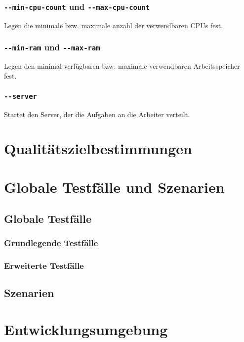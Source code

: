 \documentclass[a4paper,12pt]{article}
\begin{document}
\subsubsection{\texttt{-{}-min-cpu-count} und \texttt{-{}-max-cpu-count}}
Legen die minimale bzw. maximale anzahl der verwendbaren \glspl{CPU} fest.

\subsubsection{\texttt{-{}-min-ram} und \texttt{-{}-max-ram}}
Legen den minimal verfügbaren bzw. maximale verwendbaren Arbeitsspeicher fest.

\subsubsection{\texttt{-{}-server}}
Startet den Server, der die Aufgaben an die Arbeiter verteilt.

\section{Qualitätszielbestimmungen}

\section{Globale Testfälle und Szenarien}
\subsection{Globale Testfälle}
\subsubsection{Grundlegende Testfälle}
\subsubsection{Erweiterte Testfälle}
\subsection{Szenarien}
\section{Entwicklungsumgebung}

\clearpage
\printnoidxglossaries
\end{document}
